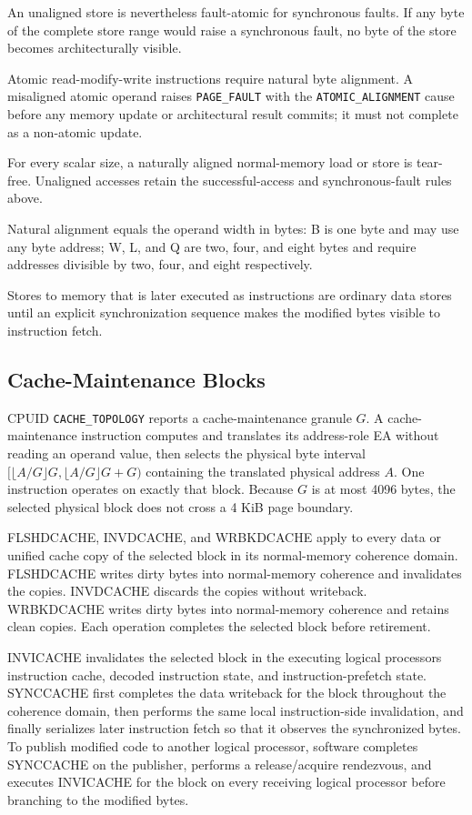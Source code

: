 An unaligned store is nevertheless fault-atomic for synchronous faults. If any byte of the complete store range
would raise a synchronous fault, no byte of the store becomes architecturally visible.

Atomic read-modify-write instructions require natural byte alignment. A misaligned atomic operand raises
\texttt{PAGE\_FAULT} with the \texttt{ATOMIC\_ALIGNMENT} cause before any memory update or architectural result
commits; it must not complete as a non-atomic update.

For every scalar size, a naturally aligned normal-memory load or store is tear-free. Unaligned accesses retain the
successful-access and synchronous-fault rules above.

Natural alignment equals the operand width in bytes: B is one byte and may use any byte address; W, L, and Q are
two, four, and eight bytes and require addresses divisible by two, four, and eight respectively.

Stores to memory that is later executed as instructions are ordinary data stores until an explicit synchronization
sequence makes the modified bytes visible to instruction fetch.

\subsection{Cache-Maintenance Blocks}
CPUID \texttt{CACHE\_TOPOLOGY} reports a cache-maintenance granule $G$. A cache-maintenance instruction computes and
translates its address-role EA without reading an operand value, then selects the physical byte interval
$[\lfloor A/G\rfloor G,\lfloor A/G\rfloor G+G)$ containing the translated physical address $A$. One instruction
operates on exactly that block. Because $G$ is at most 4096 bytes, the selected physical block does not cross a
4 KiB page boundary.

FLSHDCACHE, INVDCACHE, and WRBKDCACHE apply to every data or unified cache copy of the selected block in its
normal-memory coherence domain. FLSHDCACHE writes dirty bytes into normal-memory coherence and invalidates the
copies. INVDCACHE discards the copies without writeback. WRBKDCACHE writes dirty bytes into normal-memory coherence
and retains clean copies. Each operation completes the selected block before retirement.

INVICACHE invalidates the selected block in the executing logical processor\textquotesingle{}s instruction cache, decoded
instruction state, and instruction-prefetch state. SYNCCACHE first completes the data writeback for the block
throughout the coherence domain, then performs the same local instruction-side invalidation, and finally serializes
later instruction fetch so that it observes the synchronized bytes. To publish modified code to another logical
processor, software completes SYNCCACHE on the publisher, performs a release/acquire rendezvous, and executes
INVICACHE for the block on every receiving logical processor before branching to the modified bytes.

